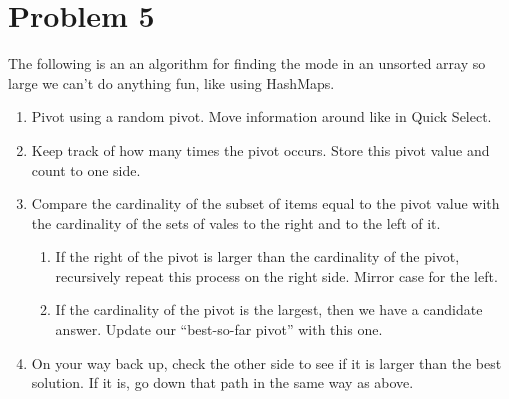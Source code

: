 \section*{Problem 5}

The following is an an algorithm for finding the mode in an unsorted array so large we can't do anything fun, like using HashMaps.
\begin{enumerate}
    \item Pivot using a random pivot. Move information around like in Quick Select.
    \item Keep track of how many times the pivot occurs. Store this pivot value and count to one side.
    \item Compare the cardinality of the subset of items equal to the pivot value with the cardinality of the sets of vales to the right and to the left of it.
    \begin{enumerate}
        \item If the right of the pivot is larger than the cardinality of the pivot, recursively repeat this process on the right side. Mirror case for the left.
        \item If the cardinality of the pivot is the largest, then we have a candidate answer. Update our ``best-so-far pivot'' with this one.
    \end{enumerate}
    \item On your way back up, check the other side to see if it is larger than the best solution. If it is, go down that path in the same way as above.
\end{enumerate}

